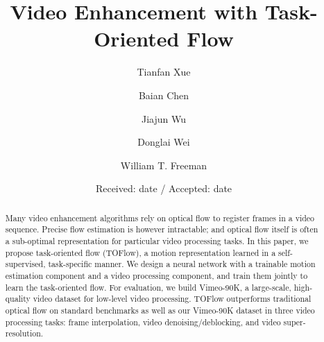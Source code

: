 \documentclass[twocolumn,natbib]{svjour3}          \smartqed  \usepackage{graphicx}
\def\data{Vimeo-90K\xspace}
\def\model{TOFlow\xspace}
\begin{document}
\title{Video Enhancement with Task-Oriented Flow}



\author{Tianfan Xue \and
        Baian Chen \and
        Jiajun Wu \and
        Donglai Wei \and
        William T. Freeman
}




\date{Received: date / Accepted: date}


\maketitle

\begin{abstract}

Many video enhancement algorithms rely on optical flow to register frames in a video sequence. Precise flow estimation is however intractable; and optical flow itself is often a sub-optimal representation for particular video processing tasks. In this paper, we propose task-oriented flow (\model), a motion representation learned in a self-supervised, task-specific manner. We design a neural network with a trainable motion estimation component and a video processing component, and train them jointly to learn the task-oriented flow. For evaluation, we build \data, a large-scale, high-quality video dataset for low-level video processing. \model outperforms traditional optical flow on standard benchmarks as well as our \data dataset in three video processing tasks: frame interpolation, video denoising/deblocking, and video super-resolution. 

\end{abstract}
\end{document}
